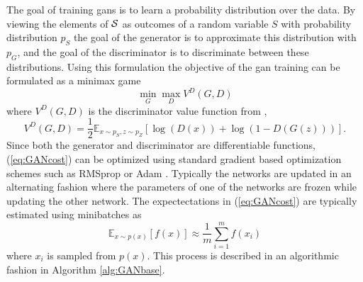 The goal of training \acrshort{gans} is to learn a probability distribution over the data. By viewing the elements of $\mathcal{S}$ as outcomes of a random variable $S$ with probability distribution $p_S$ the goal of the generator is to approximate this distribution with $p_G$, and the goal of the discriminator is to discriminate between these distributions. Using this formulation the objective of the \acrshort{gan} training can be formulated as a minimax game 
\begin{equation}
    \min_G \max_D V^{D}(G, D)
\end{equation}
where $V^D(G, D)$ is the discriminator value function from \parencite{goodfellow2016nips},
\begin{equation}
    V^D(G, D) = \frac{1}{2}\mathbb{E}_{x \sim p_S, z \sim p_Z}\left[\log(D(x)) + \log(1 - D(G(z))) \right].
    \label{eq:GANcost}
\end{equation}
Since both the generator and discriminator are differentiable functions, (\ref{eq:GANcost}) can be optimized using standard gradient based optimization schemes such as RMSprop \parencite{tieleman2012lecture} or Adam \parencite{kingma2014adam}. Typically the networks are updated in an alternating fashion where the parameters of one of the networks are frozen while updating the other network. The expectectations in (\ref{eq:GANcost}) are typically estimated using minibatches as 
\begin{equation}
    \mathbb{E}_{x\sim p(x)}[f(x)] \approx \frac{1}{m}\sum_{i=1}^mf(x_i)
\end{equation}
where $x_i$ is sampled from $p(x)$. This process is described in an algorithmic fashion in Algorithm \ref{alg:GANbase}.


